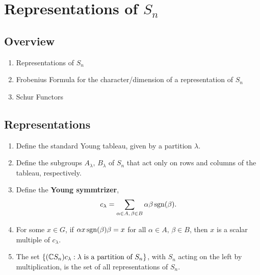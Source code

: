 \chapter{Representations of \texorpdfstring{$S_n$}{Sn}}
\label{cha:representations_of_s_n}



\section{Overview}

\begin{enumerate}
    \makethislistcompact
    \item Representations of $S_n$
    \item Frobenius Formula for the character/dimension of a representation of $S_n$
    \item Schur Functors
\end{enumerate}

\section{Representations}


\begin{enumerate}
    \makethislistcompact
    \item Define the standard Young tableau, given by a partition $\lambda$.
    \item Define the subgroups $A_\lambda,\, B_\lambda$ of $S_n$ that act only on rows and columns of the tableau, respectively.
    \item Define the \textbf{Young symmtrizer},
        \begin{align}
            c_\lambda = \sum_{\substack{\alpha\in A,\, \beta\in B}} \alpha \beta \operatorname{sgn}(\beta).
        \end{align}
    \item For some $x\in G$, if $\alpha x \operatorname{sgn}(\beta)\beta = x$ for all $\alpha\in A,\, \beta\in B$, then $x$ is a scalar multiple of $c_\lambda$.
    \item The set $\{(\mathbb{C} S_n )c_\lambda : \lambda \text{ is a partition of } S_n\}$, with $S_n$ acting on the left by multiplication, is the set of all representations of $S_n$.
\end{enumerate}


